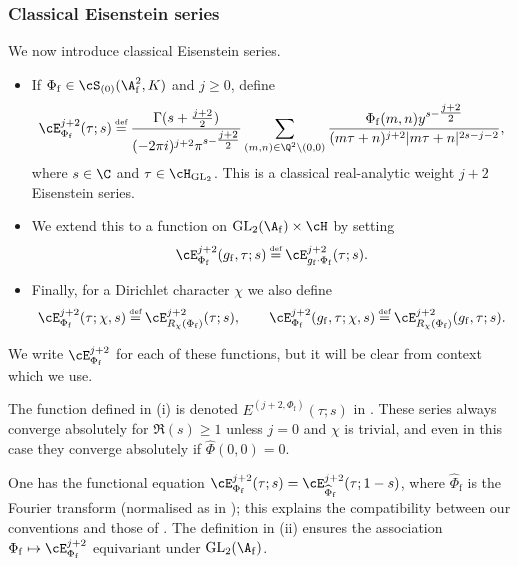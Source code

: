 \documentclass[10pt,reqno,a4paper]{amsart}
\newcommand{\Phif}{{\Phi\subf}}
\newcommand{\subf}{_{\mathrm{f}}}
\newcommand{\GL}{\mathrm{GL}}
\begin{document}
\subsubsection{Classical Eisenstein series} \label{sec:classical eisenstein}We now introduce classical Eisenstein series.

\begin{definition}\label{def:classical eisenstein}
\begin{itemize}\setlength{\itemsep}{0pt}
	\item[(i)] If $\Phif \in \cS_{(0)}(\A\subf^2,K)$ and $j \geq 0$, define
	\[
	\cE^{j+2}_\Phif(\tau;s) \defeq \frac{\Gamma(s+\tfrac{j+2}{2})}{(-2\pi i)^{j+2}\pi^{s-\tfrac{j+2}{2}}} \sum_{(m,n) \in \Q^2 \backslash (0,0)} \frac{\Phif(m,n) y^{s-\tfrac{j+2}{2}}}{(m\tau + n)^{j+2}|m\tau+n|^{2s-j-2}},
	\]
	where $s \in \C$ and $\tau \in \cH_{\GL_2}$. This is a classical real-analytic weight $j+2$ Eisenstein series.

	\item[(ii)] We extend this to a function on $\GL_2(\A_{\mathrm{f}}) \times \cH$ by setting
	\[
	\cE_{\Phif}^{j+2}(g\subf, \tau; s) \defeq \cE^{j+2}_{g\subf\cdot \Phif}(\tau;s).
	\]

	\item[(iii)] Finally, for a Dirichlet character $\chi$ we also define
	\[
	\cE_{\Phif}^{j+2}(\tau; \chi, s) \defeq \cE_{R_{\chi}(\Phif)}^{j+2}(\tau;s), \qquad \cE_{\Phif}^{j+2}(g\subf, \tau; \chi, s) \defeq \cE_{R_{\chi}(\Phif)}^{j+2}(g\subf, \tau;s).
	\]


\end{itemize}
We write $\cE^{j+2}_{\Phif}$ for each of these functions, but it will be clear from context which we use.
\end{definition}

\begin{remarks}\label{rem:eisenstein functional equation}
The function defined in (i) is denoted $E^{(j+2,\Phif)}(\tau;s)$ in \cite[Def.\ 7.1]{LPSZ19}. These series always converge absolutely for $\Re(s) \geq 1$ unless $j=0$ and $\chi$ is trivial, and even in this case they converge absolutely if $\widehat\Phi(0, 0) = 0$.

One has the functional equation $\cE_{\Phif}^{j+2}(\tau;s) = \cE_{\widehat{\Phi}\subf}^{j+2}(\tau;1-s)$, where $\widehat{\Phi}\subf$ is the Fourier transform (normalised as in \cite[\S8.1]{LPSZ19}); this explains the compatibility between our conventions and those of \cite[\S7]{LSZ17}.
The definition in (ii) ensures the association $\Phif \mapsto \cE_{\Phif}^{j+2}$ equivariant under $\GL_2(\A\subf)$.
\end{remarks}
\end{document}
